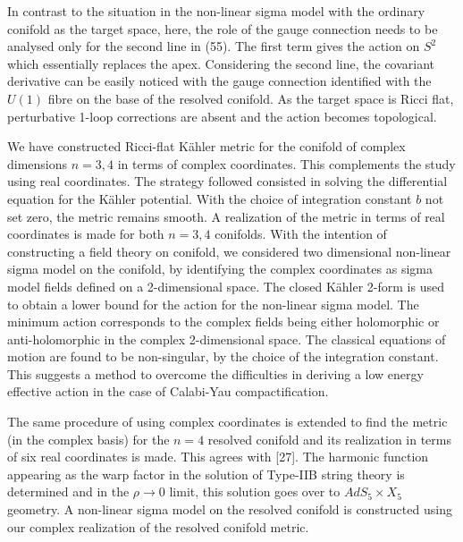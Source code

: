 \documentclass[a4paper,12pt]{article}
\begin{document}
\vspace{0.5cm}

In contrast to the situation in the non-linear sigma model with the ordinary 
conifold as the target space, here, the role of the gauge connection needs 
 to be analysed only for the second line in (55). The first 
term gives the action on $S^2$ which essentially replaces the apex. Considering
the second line, the covariant derivative can be easily noticed with the 
gauge connection identified with the $U(1)$ fibre on the base of the resolved
conifold. As the target space is Ricci flat, perturbative 1-loop corrections
are absent and the action becomes topological.  

\vspace{0.5cm}

{}

\vspace{0.5cm}

We have constructed Ricci-flat K\"{a}hler metric for the conifold of complex 
dimensions $n=3,4$ in terms of complex 
coordinates.  
This complements the study using real coordinates. The strategy 
followed consisted in solving the differential equation for the K\"{a}hler 
potential. With the choice of integration constant $b$ not set zero, the 
metric remains smooth. A realization of the metric 
in terms of real coordinates is made for both $n=3,4$ conifolds. 
With the intention 
of constructing a field theory on conifold, we considered 
two dimensional non-linear sigma 
model on the conifold, by identifying the  complex coordinates as 
sigma model fields defined on a 2-dimensional space.  
The closed K\"{a}hler 2-form is used to obtain a lower bound for the 
action for the non-linear sigma model. The minimum action 
corresponds to the complex fields being either holomorphic or 
anti-holomorphic in the complex 2-dimensional space. The classical equations 
of motion are found to be non-singular, by the choice of the integration 
constant. This suggests a method to overcome the difficulties in deriving 
a low energy effective action in the case of Calabi-Yau compactification. 

\vspace{0.5cm}


The same procedure of using complex coordinates is extended to find the 
metric (in the complex basis) for the $n=4$ resolved conifold 
and its realization  
in terms of six real coordinates is made. This agrees with [27]. The 
harmonic function appearing as the warp factor in the solution of Type-IIB 
string theory is determined and in the $\rho \rightarrow 0$ limit,  
this solution goes over to  $AdS_5 
\times X_5$ geometry. A non-linear sigma model on the resolved conifold 
is constructed using our complex realization of the resolved conifold 
metric.  
\end{document}
